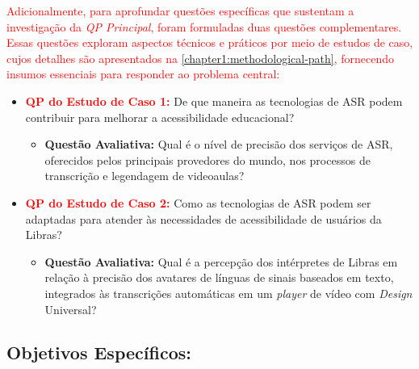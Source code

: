 \textcolor{red}{Adicionalmente, para aprofundar questões específicas que sustentam a investigação da \textit{QP Principal}, foram formuladas duas questões complementares. Essas questões exploram aspectos técnicos e práticos por meio de estudos de caso, cujos detalhes são apresentados na \autoref{chapter1:methodological-path}, fornecendo insumos essenciais para responder ao problema central:}

\begin{itemize}
    \item \textcolor{red}{\textbf{QP do Estudo de Caso 1:}} De que maneira as tecnologias de ASR podem contribuir para melhorar a acessibilidade educacional?
    \begin{itemize}
        \item \textbf{Questão Avaliativa:} Qual é o nível de precisão dos serviços de ASR, oferecidos pelos principais provedores do mundo, nos processos de transcrição e legendagem de videoaulas?
    \end{itemize}
    
    \item \textcolor{red}{\textbf{QP do Estudo de Caso 2:}} Como as tecnologias de ASR podem ser adaptadas para atender às necessidades de acessibilidade de usuários da Libras?
    \begin{itemize}
        \item \textbf{Questão Avaliativa:} Qual é a percepção dos intérpretes de Libras em relação à precisão dos avatares de línguas de sinais baseados em texto, integrados às transcrições automáticas em um \textit{player} de vídeo com \textit{Design} Universal?
    \end{itemize}
\end{itemize}

\subsection*{Objetivos Específicos:}

